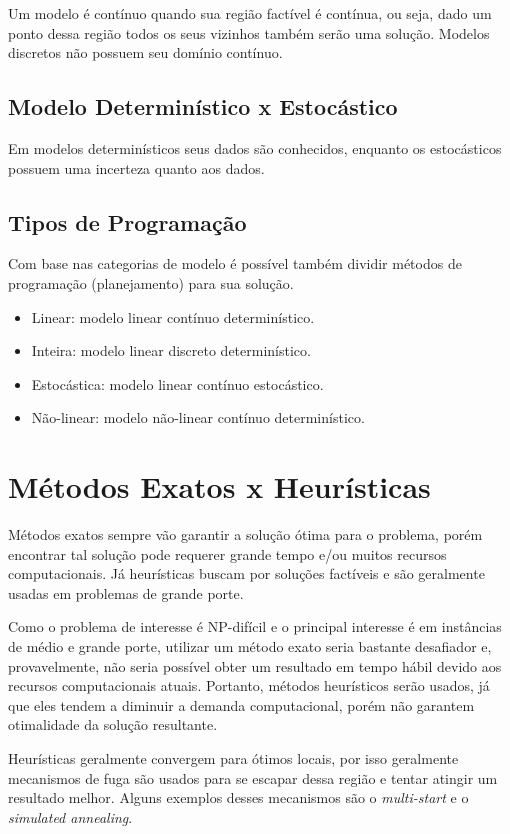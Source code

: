 Um modelo é contínuo quando sua região factível é contínua, ou seja, dado um ponto dessa região todos os seus vizinhos também serão uma solução.
Modelos discretos não possuem seu domínio contínuo.

\subsection{Modelo Determinístico x Estocástico}\label{subsec:modelo-deterministico-x-estocastico}

Em modelos determinísticos seus dados são conhecidos, enquanto os estocásticos possuem uma incerteza quanto aos dados.

\subsection{Tipos de Programação}\label{subsec:tipos-de-programacao}

Com base nas categorias de modelo é possível também dividir métodos de programação (planejamento) para sua solução.

\begin{itemize}
    \item Linear: modelo linear contínuo determinístico.
    \item Inteira: modelo linear discreto determinístico.
    \item Estocástica: modelo linear contínuo estocástico.
    \item Não-linear: modelo não-linear contínuo determinístico.
\end{itemize}


\section{Métodos Exatos x Heurísticas}\label{sec:metodos-exatos-x-heuristicas}

Métodos exatos sempre vão garantir a solução ótima para o problema, porém encontrar tal solução pode requerer grande tempo e/ou muitos recursos computacionais.
Já heurísticas buscam por soluções factíveis e são geralmente usadas em problemas de grande porte.

Como o problema de interesse é NP-difícil e o principal interesse é em instâncias de médio e grande porte, utilizar um método exato seria bastante desafiador e, provavelmente, não seria possível obter um resultado em tempo hábil devido aos recursos computacionais atuais.
Portanto, métodos heurísticos serão usados, já que eles tendem a diminuir a demanda computacional, porém não garantem otimalidade da solução resultante.

Heurísticas geralmente convergem para ótimos locais, por isso geralmente mecanismos de fuga são usados para se escapar dessa região e tentar atingir um resultado melhor.
Alguns exemplos desses mecanismos são o \textit{multi-start} e o \textit{simulated annealing}.
